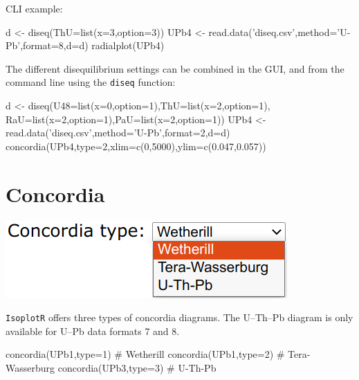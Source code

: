 \begin{refsection}
\begin{enumerate}
\begin{enumerate}
\noindent CLI example:
\begin{script}
d <- diseq(ThU=list(x=3,option=3))
UPb4 <- read.data('diseq.csv',method='U-Pb',format=8,d=d)
radialplot(UPb4)
\end{script}

\end{enumerate}

The different disequilibrium settings can be combined in the GUI, and
from the command line using the \texttt{diseq} function:

\begin{script}
d <- diseq(U48=list(x=0,option=1),ThU=list(x=2,option=1),
           RaU=list(x=2,option=1),PaU=list(x=2,option=1))
UPb4 <- read.data('diseq.csv',method='U-Pb',format=2,d=d)
concordia(UPb4,type=2,xlim=c(0,5000),ylim=c(0.047,0.057))
\end{script}

\end{enumerate}

\section{Concordia} \label{sec:concordia-R}

\noindent\begin{minipage}[t]{.3\linewidth}
  \strut\vspace*{-\baselineskip}\newline
  \includegraphics[width=\linewidth]{../figures/ConcordiaMenu.png}
\end{minipage}
\begin{minipage}[t]{.7\linewidth}
  \texttt{IsoplotR} offers three types of concordia diagrams. The
  U--Th--Pb diagram is only available for U--Pb data formats 7 and 8.
\end{minipage}

\begin{script}
concordia(UPb1,type=1) # Wetherill
concordia(UPb1,type=2) # Tera-Wasserburg
concordia(UPb3,type=3) # U-Th-Pb
\end{script}

\begin{enumerate}


\end{enumerate}
\end{refsection}
